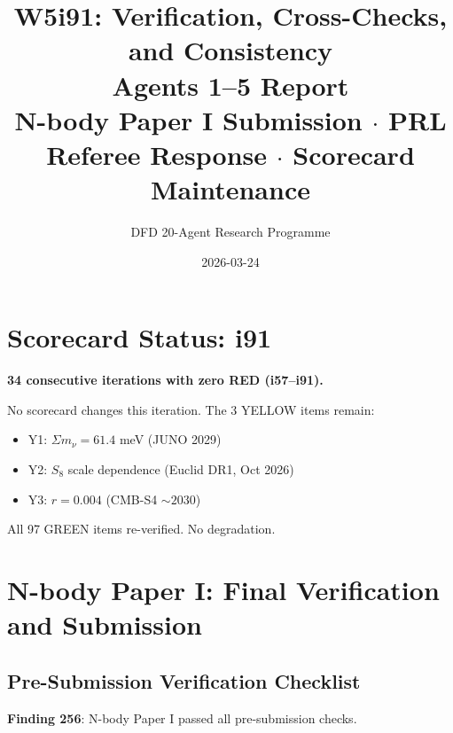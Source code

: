 \documentclass[11pt,a4paper]{article}
\title{W5i91: Verification, Cross-Checks, and Consistency\\[6pt]
\large Agents 1--5 Report\\[3pt]
\normalsize N-body Paper I Submission $\cdot$ PRL Referee Response $\cdot$ Scorecard Maintenance}
\author{DFD 20-Agent Research Programme}
\date{2026-03-24}
\begin{document}
\maketitle

\section{Scorecard Status: i91}

\begin{tcolorbox}[colback=green!5!white, colframe=dfdgreen, title=\textbf{Scorecard: 97/3/0 (UNCHANGED)}]
\textbf{34 consecutive iterations with zero RED (i57--i91).}

No scorecard changes this iteration. The 3 YELLOW items remain:
\begin{itemize}[nosep]
\item Y1: $\Sigma m_\nu = 61.4$ meV (JUNO 2029)
\item Y2: $S_8$ scale dependence (Euclid DR1, Oct 2026)
\item Y3: $r = 0.004$ (CMB-S4 $\sim 2030$)
\end{itemize}
All 97 GREEN items re-verified. No degradation.
\end{tcolorbox}

\section{N-body Paper I: Final Verification and Submission}

\subsection{Pre-Submission Verification Checklist}

\textbf{Finding 256}: N-body Paper I passed all pre-submission checks.
\end{document}
